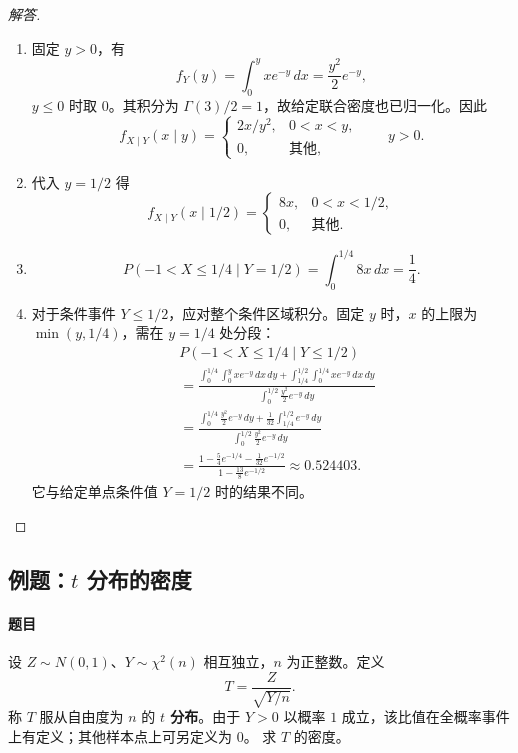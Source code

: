 \begin{proof}[解答]
\begin{enumerate}
\item 固定 $y>0$，有
\[
f_Y(y)=\int_0^yxe^{-y}\,dx=\frac{y^2}2e^{-y},
\]
$y\leq0$ 时取 $0$。其积分为 $\Gamma(3)/2=1$，故给定联合密度也已归一化。因此
\[
f_{X\mid Y}(x\mid y)=
\begin{cases}
2x/y^2,&0<x<y,\\
0,&\text{其他},
\end{cases}\qquad y>0.
\]

\item 代入 $y=1/2$ 得
\[
f_{X\mid Y}(x\mid1/2)=
\begin{cases}
8x,&0<x<1/2,\\
0,&\text{其他}.
\end{cases}
\]

\item \[
P(-1<X\leq1/4\mid Y=1/2)=\int_0^{1/4}8x\,dx=\frac14.
\]

\item 对于条件事件 $Y\leq1/2$，应对整个条件区域积分。固定 $y$ 时，$x$ 的上限为 $\min(y,1/4)$，需在 $y=1/4$ 处分段：
\begin{align*}
&P(-1<X\leq1/4\mid Y\leq1/2)\\
&=\frac{\displaystyle
 \int_0^{1/4}\int_0^yxe^{-y}\,dx\,dy+
 \int_{1/4}^{1/2}\int_0^{1/4}xe^{-y}\,dx\,dy}
 {\displaystyle\int_0^{1/2}\frac{y^2}2e^{-y}\,dy}\\
&=\frac{\displaystyle
 \int_0^{1/4}\frac{y^2}2e^{-y}\,dy+
 \frac1{32}\int_{1/4}^{1/2}e^{-y}\,dy}
 {\displaystyle\int_0^{1/2}\frac{y^2}2e^{-y}\,dy}\\
&=\frac{1-\frac54e^{-1/4}-\frac1{32}e^{-1/2}}
 {1-\frac{13}8e^{-1/2}}
\approx0.524403.
\end{align*}
它与给定单点条件值 $Y=1/2$ 时的结果不同。
\end{enumerate}
\end{proof}

\subsection{例题：\texorpdfstring{$t$ 分布的密度}{t 分布的密度}}\label{note:c3:e13}
\paragraph{题目}
设 $Z\sim N(0,1)$、$Y\sim\chi^2(n)$ 相互独立，$n$ 为正整数。定义
\[
T=\frac{Z}{\sqrt{Y/n}}.
\]
称 $T$ 服从自由度为 $n$ 的 \textbf{$t$ 分布}。由于 $Y>0$ 以概率 $1$ 成立，该比值在全概率事件上有定义；其他样本点上可另定义为 $0$。
求 $T$ 的密度。

